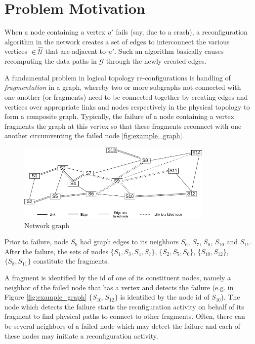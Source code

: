 \documentclass[a4paper,12pt]{article}
\newcommand{\<}{\langle}
\renewcommand{\>}{\rangle}
\theoremstyle{definition}
\begin{document}
\section{Problem Motivation}

When a node containing a vertex $u'$ fails (say, due to a crash), a reconfiguration algorithm in the network creates a set of edges to interconnect the various vertices $\in\hat{\mathcal{U}}$ that are adjacent to $u'$. Such an algorithm basically causes recomputing the data paths in $\mathcal{G}$ through the newly created edges. 

A fundamental problem in logical topology re-configurations is handling of \emph{fragmentation} in a graph, whereby two or more subgraphs not connected with one another (or fragments) need to be connected together by creating edges and vertices over appropriate links and nodes respectively in the physical topology to form a composite graph. Typically, the failure of a node containing a vertex fragments the graph at this vertex so that these fragments reconnect with one another circumventing the failed node   \ref{fig:example_graph}. 

\begin{figure}[!h]
    \centering
    \includegraphics[width=0.85\textwidth]{distributed.png}
    \caption{Network graph}
    \label{fig:basic_octree}
\end{figure}

Prior to failure, node $S_{9}$ had graph edges to its neighbors $S_{6}$, $S_{7}$, $S_{8}$, $S_{10}$ and $S_{11}$. After the failure, the sets of nodes $\{S_{1}, S_{3}, S_{4}, S_{7}\}$, $\{S_{2}, S_{5}, S_{6}\}$, $\{S_{10}, S_{12}\}$, $\{S_{8}, S_{11}\}$ constitute the fragments. 

A fragment is identified by the id of one of its constituent nodes, namely a neighbor of the failed node that has a vertex and detects the failure (e.g. in Figure \ref{fig:example_graph} $\{S_{10}, S_{12}\}$ is identified by the node id of $S_{10}$). The node which detects the failure starts the recnfiguration activity on behalf of its fragment to find physical paths to connect to other fragments. Often, there can be several neighbors of a failed node which may detect the failure and each of these nodes may initiate a reconfiguration activity.
\end{document}
